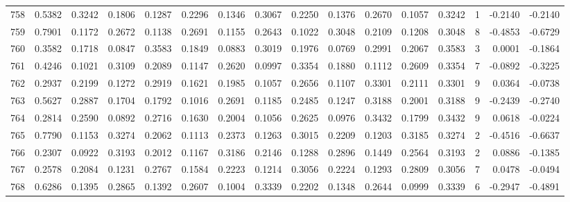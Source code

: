 \begin{tabular}{lrrrrrrrrrrrrrrr}
758 &      0.5382 &  0.3242 &  0.1806 &  0.1287 &  0.2296 &  0.1346 &  0.3067 &  0.2250 &  0.1376 &  0.2670 &   0.1057 &     0.3242 &      1 &                   -0.2140 &                    -0.2140 \\
759 &      0.7901 &  0.1172 &  0.2672 &  0.1138 &  0.2691 &  0.1155 &  0.2643 &  0.1022 &  0.3048 &  0.2109 &   0.1208 &     0.3048 &      8 &                   -0.4853 &                    -0.6729 \\
760 &      0.3582 &  0.1718 &  0.0847 &  0.3583 &  0.1849 &  0.0883 &  0.3019 &  0.1976 &  0.0769 &  0.2991 &   0.2067 &     0.3583 &      3 &                    0.0001 &                    -0.1864 \\
761 &      0.4246 &  0.1021 &  0.3109 &  0.2089 &  0.1147 &  0.2620 &  0.0997 &  0.3354 &  0.1880 &  0.1112 &   0.2609 &     0.3354 &      7 &                   -0.0892 &                    -0.3225 \\
762 &      0.2937 &  0.2199 &  0.1272 &  0.2919 &  0.1621 &  0.1985 &  0.1057 &  0.2656 &  0.1107 &  0.3301 &   0.2111 &     0.3301 &      9 &                    0.0364 &                    -0.0738 \\
763 &      0.5627 &  0.2887 &  0.1704 &  0.1792 &  0.1016 &  0.2691 &  0.1185 &  0.2485 &  0.1247 &  0.3188 &   0.2001 &     0.3188 &      9 &                   -0.2439 &                    -0.2740 \\
764 &      0.2814 &  0.2590 &  0.0892 &  0.2716 &  0.1630 &  0.2004 &  0.1056 &  0.2625 &  0.0976 &  0.3432 &   0.1799 &     0.3432 &      9 &                    0.0618 &                    -0.0224 \\
765 &      0.7790 &  0.1153 &  0.3274 &  0.2062 &  0.1113 &  0.2373 &  0.1263 &  0.3015 &  0.2209 &  0.1203 &   0.3185 &     0.3274 &      2 &                   -0.4516 &                    -0.6637 \\
766 &      0.2307 &  0.0922 &  0.3193 &  0.2012 &  0.1167 &  0.3186 &  0.2146 &  0.1288 &  0.2896 &  0.1449 &   0.2564 &     0.3193 &      2 &                    0.0886 &                    -0.1385 \\
767 &      0.2578 &  0.2084 &  0.1231 &  0.2767 &  0.1584 &  0.2223 &  0.1214 &  0.3056 &  0.2224 &  0.1293 &   0.2809 &     0.3056 &      7 &                    0.0478 &                    -0.0494 \\
768 &      0.6286 &  0.1395 &  0.2865 &  0.1392 &  0.2607 &  0.1004 &  0.3339 &  0.2202 &  0.1348 &  0.2644 &   0.0999 &     0.3339 &      6 &                   -0.2947 &                    -0.4891 \\

\end{tabular}
